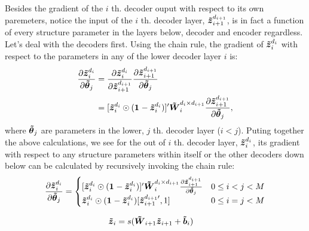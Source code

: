 Besides the gradient of the $i$ th. decoder ouput with respect to  its own paremeters, notice the input of the $i$ th. decoder layer, $\iDi$, is in fact a function of every structure parameter in the layers below, decoder and encoder regardless. Let's deal with the decoders first. Using the chain rule, the gradient of $\oDi$ with respect to the parameters in any of the lower decoder layer $i$ is:
\begin{equation*}
\begin{split}
  \PDV{\oDi}{\pDC_j}
  &= \PDV{\oDi}{\iDi} \PDV{\iDi}{\pDC_j} \\
  &= [\oDi \odot (\one{} - \oDi)]^\prime \WDi \PDV{\iDi}{\pDC_j}, 
\end{split}
\end{equation*}
where $\pDC_j$ are parameters in the lower, $j$ th. decoder layer ($i < j$). Puting together the above calculations, we see for the out of $i$ th. decoder layer, $\oDi$, its gradient with respect to any structure parameters within itself or the other decoders down below can be calculated by recursively invoking the chain rule:
\begin{equation*}
\begin{split}
  \PDV{\oDi}{\pDC_j} =
  \begin{cases}
    [\oDi \odot (\one{} - \oDi)]^\prime \WDi \PDV{\zDC_{i+1}^{d_{i+1}}}{\pDC_j} & 0 \le i < j < M \\
    \oDi \odot (\one{} - \oDi) [\zDC_{i+1}^{d_{i+1}\prime}, 1]                  & 0 \le i = j < M
  \end{cases}
\end{split}
\end{equation*}

\begin{equation*}
\begin{split}
  \zDC_i &= s(\WDC_{i+1} \zDC_{i+1} + \bDC_i)
\end{split}
\end{equation*}

